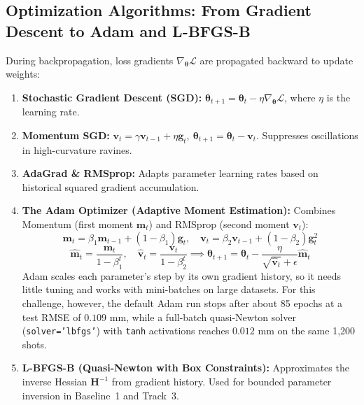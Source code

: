 \documentclass[11pt,a4paper]{article}
\begin{document}
\subsection{Optimization Algorithms: From Gradient Descent to Adam and L-BFGS-B}
During backpropagation, loss gradients $\nabla_{\boldsymbol{\theta}} \mathcal{L}$ are propagated backward to update weights:
\begin{enumerate}
    \item \textbf{Stochastic Gradient Descent (SGD):} $\boldsymbol{\theta}_{t+1} = \boldsymbol{\theta}_t - \eta \nabla_{\boldsymbol{\theta}} \mathcal{L}$, where $\eta$ is the learning rate.
    \item \textbf{Momentum SGD:} $\mathbf{v}_t = \gamma \mathbf{v}_{t-1} + \eta \mathbf{g}_t, \ \boldsymbol{\theta}_{t+1} = \boldsymbol{\theta}_t - \mathbf{v}_t$. Suppresses oscillations in high-curvature ravines.
    \item \textbf{AdaGrad \& RMSprop:} Adapts parameter learning rates based on historical squared gradient accumulation.
    \item \textbf{The Adam Optimizer (Adaptive Moment Estimation):} Combines Momentum (first moment $\mathbf{m}_t$) and RMSprop (second moment $\mathbf{v}_t$):
    \begin{equation}
        \mathbf{m}_t = \beta_1 \mathbf{m}_{t-1} + (1-\beta_1) \mathbf{g}_t, \quad \mathbf{v}_t = \beta_2 \mathbf{v}_{t-1} + (1-\beta_2) \mathbf{g}_t^2
    \end{equation}
    \begin{equation}
        \hat{\mathbf{m}}_t = \frac{\mathbf{m}_t}{1-\beta_1^t}, \quad \hat{\mathbf{v}}_t = \frac{\mathbf{v}_t}{1-\beta_2^t} \implies \boldsymbol{\theta}_{t+1} = \boldsymbol{\theta}_t - \frac{\eta}{\sqrt{\hat{\mathbf{v}}_t} + \epsilon} \hat{\mathbf{m}}_t
    \end{equation}
    Adam scales each parameter's step by its own gradient history, so it needs little tuning and works with mini-batches on large datasets. For this challenge, however, the default Adam run stops after about 85 epochs at a test RMSE of $0.109\text{ mm}$, while a full-batch quasi-Newton solver (\texttt{solver='lbfgs'}) with \texttt{tanh} activations reaches $0.012\text{ mm}$ on the same 1,200 shots.
    \item \textbf{L-BFGS-B (Quasi-Newton with Box Constraints):} Approximates the inverse Hessian $\mathbf{H}^{-1}$ from gradient history. Used for bounded parameter inversion in Baseline~1 and Track~3.
\end{enumerate}
\end{document}
